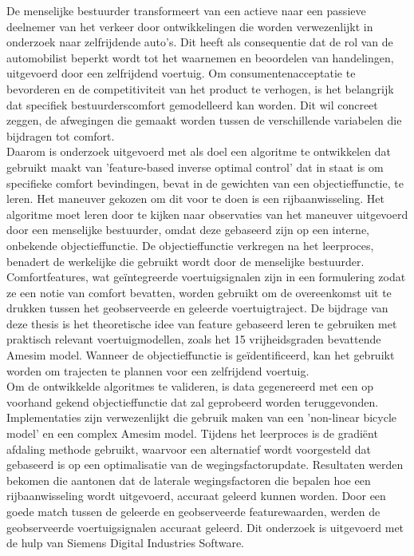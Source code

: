 \documentclass[master=wtk,english]{kulemt}
\begin{document}
\begin{abstract*}
De menselijke bestuurder transformeert van een actieve naar een passieve deelnemer van het verkeer door ontwikkelingen die worden verwezenlijkt in onderzoek naar zelfrijdende auto's.  Dit heeft als consequentie dat de rol van de automobilist beperkt wordt tot het waarnemen en beoordelen van handelingen, uitgevoerd door een zelfrijdend voertuig.  Om consumentenacceptatie te bevorderen en de competitiviteit van het product te verhogen, is het belangrijk dat specifiek bestuurderscomfort gemodelleerd kan worden. Dit wil concreet zeggen, de afwegingen die gemaakt worden tussen de verschillende variabelen die bijdragen tot comfort.\\

Daarom is onderzoek uitgevoerd met als doel een algoritme te ontwikkelen dat gebruikt maakt van 'feature-based inverse optimal control' dat in staat is om specifieke comfort bevindingen, bevat in de gewichten van een objectieffunctie, te leren. Het maneuver gekozen om dit voor te doen is een rijbaanwisseling. Het algoritme moet leren door te kijken naar observaties van het maneuver uitgevoerd door een menselijke bestuurder, omdat deze gebaseerd zijn op een interne, onbekende objectieffunctie. De objectieffunctie verkregen na het leerproces, benadert de werkelijke die gebruikt wordt door de menselijke bestuurder.\\ Comfortfeatures, wat ge{\"i}ntegreerde voertuigsignalen zijn in een formulering zodat ze een notie van comfort bevatten, worden gebruikt om de overeenkomst uit te drukken tussen het geobserveerde en geleerde voertuigtraject. De bijdrage van deze thesis is het theoretische idee van feature gebaseerd leren te gebruiken met praktisch relevant voertuigmodellen, zoals het 15 vrijheidsgraden bevattende Amesim model. Wanneer de objectieffunctie is ge{\"i}dentificeerd, kan het gebruikt worden om trajecten te plannen voor een zelfrijdend voertuig.\\

Om de ontwikkelde algoritmes te valideren, is data gegenereerd met een op voorhand gekend objectieffunctie dat zal geprobeerd worden teruggevonden. Implementaties zijn verwezenlijkt die gebruik maken van een 'non-linear bicycle model' en een complex Amesim model. Tijdens het leerproces is de gradi{\"e}nt afdaling methode gebruikt, waarvoor een alternatief wordt voorgesteld dat gebaseerd is op een optimalisatie van de wegingsfactorupdate.
Resultaten werden bekomen die aantonen dat de laterale wegingsfactoren die bepalen hoe een rijbaanwisseling wordt uitgevoerd, accuraat geleerd kunnen worden. Door een goede match tussen de geleerde en geobserveerde featurewaarden, werden de geobserveerde voertuigsignalen accuraat geleerd. Dit onderzoek is uitgevoerd met de hulp van Siemens Digital Industries Software.  



  

\end{abstract*}
\end{document}
